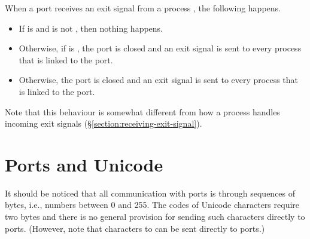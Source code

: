 When a port  receives an exit signal  from a process , the following happens.
\begin{itemize}
\item If  is  and 
is not , then nothing happens.
\item Otherwise, if  is ,
the port is closed and an exit signal  is sent
to every process that is linked to the port.
\item Otherwise, the port is closed and an exit signal  is sent to every process that is
linked to the port.
\end{itemize}
Note that this behaviour is somewhat different from how a process handles incoming exit signals
(\S\ref{section:receiving-exit-signal}).

\ifStd
\section{Ports and Unicode}

\label{section:ports-unicode}

It should be noticed that all communication with ports is through sequences of bytes,
i.e., numbers between 0 and 255.  The codes of Unicode characters require two bytes
and there is no general provision for sending such characters directly to ports.
(However, note that characters  to  can be sent directly
to ports.)

